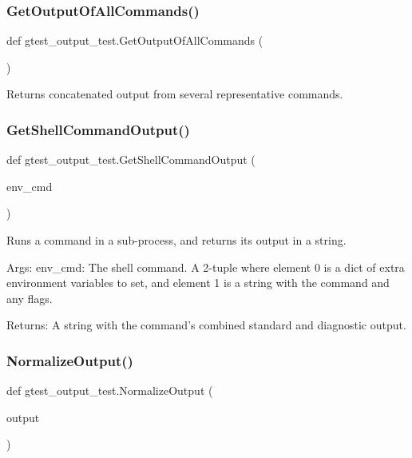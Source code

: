 \subsubsection{\texorpdfstring{Get\+Output\+Of\+All\+Commands()}{GetOutputOfAllCommands()}}
{\footnotesize\ttfamily def gtest\+\_\+output\+\_\+test.\+Get\+Output\+Of\+All\+Commands (\begin{DoxyParamCaption}{ }\end{DoxyParamCaption})}

\begin{DoxyVerb}Returns concatenated output from several representative commands.\end{DoxyVerb}
 \mbox{\label{namespacegtest__output__test_a0dbdd37611259249a58ab13ed60d8172}} 
\subsubsection{\texorpdfstring{Get\+Shell\+Command\+Output()}{GetShellCommandOutput()}}
{\footnotesize\ttfamily def gtest\+\_\+output\+\_\+test.\+Get\+Shell\+Command\+Output (\begin{DoxyParamCaption}\item[{}]{env\+\_\+cmd }\end{DoxyParamCaption})}

\begin{DoxyVerb}Runs a command in a sub-process, and returns its output in a string.

Args:
  env_cmd: The shell command. A 2-tuple where element 0 is a dict of extra
           environment variables to set, and element 1 is a string with
           the command and any flags.

Returns:
  A string with the command's combined standard and diagnostic output.
\end{DoxyVerb}
 \mbox{\label{namespacegtest__output__test_a457700303177f330388e249a23b0c63a}} 
\subsubsection{\texorpdfstring{Normalize\+Output()}{NormalizeOutput()}}
{\footnotesize\ttfamily def gtest\+\_\+output\+\_\+test.\+Normalize\+Output (\begin{DoxyParamCaption}\item[{}]{output }\end{DoxyParamCaption})}

